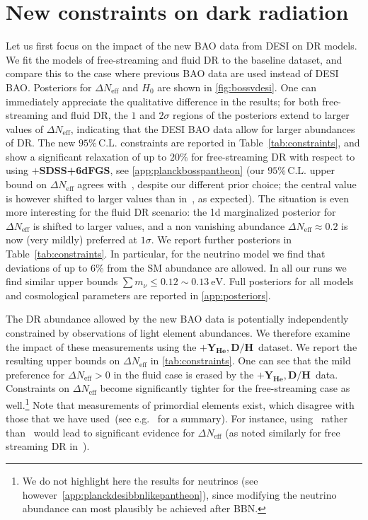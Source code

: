 \documentclass[aps,prd,twocolumn,notitlepage,
superscriptaddress,
nofootinbib,floatfix]{revtex4-2}
\newcommand{\boss}{$\mathbf{+}$\textbf{SDSS+6dFGS}}
\newcommand{\bbnlike}{$\mathbf{+ Y_\text{He}, D/H}$}
\newcommand{\DNeff}{\Delta N_\text{eff}}
\begin{document}
\section{New constraints on dark radiation}\label{sec:constraints}

Let us first focus on the impact of the new BAO data from DESI on DR models. We fit the models of free-streaming and fluid DR to the baseline dataset, and compare this to the case where previous BAO data are used instead of DESI BAO. Posteriors for $\Delta N_\text{eff}$ and $H_0$ are shown in \cref{fig:bossvdesi}. One can immediately appreciate the qualitative difference in the results; for both free-streaming and fluid DR, the $1$ and $2\sigma$ regions of the posteriors extend to larger values of $\DNeff$, indicating that the DESI BAO data allow for larger abundances of DR. The new  $95\% \,\text{C.L.}$ constraints are reported in Table~\ref{tab:constraints}, and show a significant relaxation 
of up to $20\%$ for free-streaming DR with respect to using \boss, see \cref{app:planckbosspantheon} (our $95\%\, \text{C.L.}$ upper bound on $\Delta N_\text{eff}$ agrees with~\cite{DESI:2024mwx}, despite our different prior choice; the central value is however shifted to larger values than in~\cite{DESI:2024mwx}, as expected). The situation is even more interesting for the fluid DR scenario: the 1d marginalized posterior for $\Delta N_\text{eff}$ is shifted to larger values, and a non vanishing abundance $\Delta N_\text{eff}\approx 0.2$ is now (very mildly) preferred at $1\sigma$. We report further posteriors in Table~\ref{tab:constraints}. In particular, for the neutrino model we find that deviations of up to $6\%$ from the SM abundance are allowed. In all our runs we find similar upper bounds $\sum m_\nu\leq 0.12\sim 0.13~\text{eV}$. Full posteriors for all models and cosmological parameters are reported in \cref{app:posteriors}.

The DR abundance allowed by the new BAO data is potentially independently constrained by observations of light element abundances. We therefore examine the impact of these measurements using the \bbnlike\, dataset. We report the resulting upper bounds on $\Delta N_\text{eff}$ in \cref{tab:constraints}. One can see that the mild preference for $\DNeff>0$ in the fluid case is erased by the \bbnlike\, data. Constraints on $\DNeff$ become significantly tighter for the free-streaming case as well.\footnote{We do not highlight here the results for neutrinos (see however~\cref{app:planckdesibbnlikepantheon}), since modifying the neutrino abundance can most plausibly be achieved after BBN.} Note that measurements of primordial elements exist, which disagree with those that we have used~(see e.g.~\cite{Planck:2018vyg, Aver:2020fon} for a summary). For instance, using~\cite{Izotov:2014fga} rather than~\cite{Aver:2015iza} would lead to significant evidence for $\DNeff$ (as noted similarly for free streaming DR in~\cite{Planck:2018vyg, Schoneberg:2019wmt}).
\end{document}
